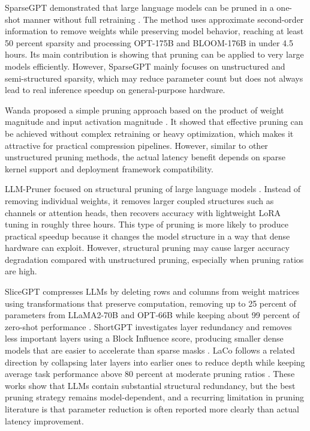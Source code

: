 SparseGPT demonstrated that large language models can be pruned in a one-shot manner without full retraining \cite{frantar2023sparsegpt}. The method uses approximate second-order information to remove weights while preserving model behavior, reaching at least 50 percent sparsity and processing OPT-175B and BLOOM-176B in under 4.5 hours. Its main contribution is showing that pruning can be applied to very large models efficiently. However, SparseGPT mainly focuses on unstructured and semi-structured sparsity, which may reduce parameter count but does not always lead to real inference speedup on general-purpose hardware.

Wanda proposed a simple pruning approach based on the product of weight magnitude and input activation magnitude \cite{sun2024wanda}. It showed that effective pruning can be achieved without complex retraining or heavy optimization, which makes it attractive for practical compression pipelines. However, similar to other unstructured pruning methods, the actual latency benefit depends on sparse kernel support and deployment framework compatibility.

LLM-Pruner focused on structural pruning of large language models \cite{ma2023llmpruner}. Instead of removing individual weights, it removes larger coupled structures such as channels or attention heads, then recovers accuracy with lightweight LoRA tuning in roughly three hours. This type of pruning is more likely to produce practical speedup because it changes the model structure in a way that dense hardware can exploit. However, structural pruning may cause larger accuracy degradation compared with unstructured pruning, especially when pruning ratios are high.

SliceGPT compresses LLMs by deleting rows and columns from weight matrices using transformations that preserve computation, removing up to 25 percent of parameters from LLaMA2-70B and OPT-66B while keeping about 99 percent of zero-shot performance \cite{ashkboos2024slicegpt}. ShortGPT investigates layer redundancy and removes less important layers using a Block Influence score, producing smaller dense models that are easier to accelerate than sparse masks \cite{men2024shortgpt}. LaCo follows a related direction by collapsing later layers into earlier ones to reduce depth while keeping average task performance above 80 percent at moderate pruning ratios \cite{yang2024laco}. These works show that LLMs contain substantial structural redundancy, but the best pruning strategy remains model-dependent, and a recurring limitation in pruning literature is that parameter reduction is often reported more clearly than actual latency improvement.

